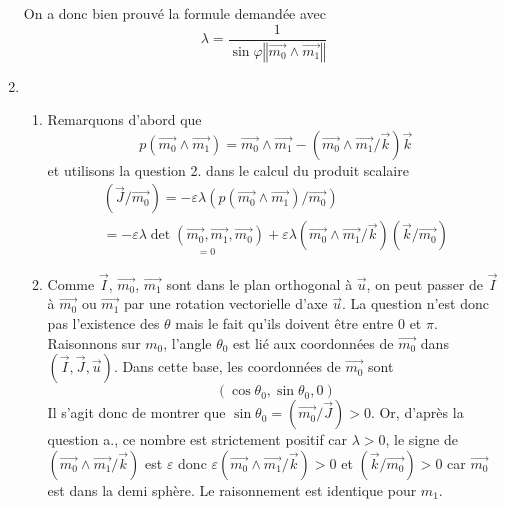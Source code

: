 \begin{enumerate}
On a donc bien prouvé la formule demandée avec
\begin{displaymath}
 \lambda = \frac{1}{\sin\varphi \left\Vert \overrightarrow{m_0}\wedge \overrightarrow{m_1}\right\Vert}
\end{displaymath}

 \item 
\begin{enumerate}
 \item Remarquons d'abord que
\begin{displaymath}
 p(\overrightarrow{m_0}\wedge \overrightarrow{m_1})= \overrightarrow{m_0}\wedge \overrightarrow{m_1}
-(\overrightarrow{m_0}\wedge \overrightarrow{m_1}/\overrightarrow{k})\overrightarrow{k}
\end{displaymath}
et utilisons la question 2. dans le calcul du produit scalaire
\begin{multline*}
 (\overrightarrow{J}/\overrightarrow{m_0})
= -\varepsilon\lambda (p(\overrightarrow{m_0}\wedge \overrightarrow{m_1})/\overrightarrow{m_0})\\
= -\varepsilon\lambda \underset{=0}{\det(\overrightarrow{m_0}, \overrightarrow{m_1},\overrightarrow{m_0})}
+\varepsilon\lambda (\overrightarrow{m_0}\wedge \overrightarrow{m_1}/\overrightarrow{k})(\overrightarrow{k}/\overrightarrow{m_0})
\end{multline*}

 \item Comme $\overrightarrow{I}$, $\overrightarrow{m_0}$, $\overrightarrow{m_1}$ sont dans le plan orthogonal à $\overrightarrow{u}$, on peut passer de $\overrightarrow{I}$ à $\overrightarrow{m_0}$ ou $\overrightarrow{m_1}$ par une rotation vectorielle d'axe $\overrightarrow{u}$. La question n'est donc pas l'existence des $\theta$ mais le fait qu'ils doivent être entre $0$ et $\pi$.\newline
Raisonnons sur $m_0$, l'angle $\theta_0$ est lié aux coordonnées de $\overrightarrow{m_0}$ dans $(\overrightarrow{I},\overrightarrow{J},\overrightarrow{u})$. Dans cette base, les coordonnées de $\overrightarrow{m_0}$ sont
\begin{displaymath}
 (\cos\theta_0 , \sin \theta_0, 0)
\end{displaymath}
Il s'agit donc de montrer que $\sin \theta_0 = (\overrightarrow{m_0}/\overrightarrow{J})>0$. Or, d'après la question a., ce nombre est strictement positif car $\lambda >0$, le signe de $(\overrightarrow{m_0}\wedge \overrightarrow{m_1}/\overrightarrow{k})$ est $\varepsilon$ donc $\varepsilon(\overrightarrow{m_0}\wedge \overrightarrow{m_1}/\overrightarrow{k})>0$ et $(\overrightarrow{k}/\overrightarrow{m_0})>0$ car $\overrightarrow{m_0}$ est dans la demi sphère.\newline
Le raisonnement est identique pour $m_1$.
\end{enumerate}


\end{enumerate}
